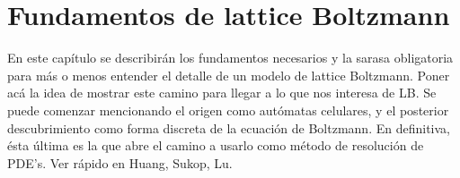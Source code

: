 \chapter{Fundamentos de lattice Boltzmann}
\label{chap:fundamentos}

En este cap\'itulo se describir\'an los fundamentos necesarios y la sarasa obligatoria para m\'as o menos entender el detalle de un modelo de lattice Boltzmann.
Poner ac\'a la idea de mostrar este camino para llegar a lo que nos interesa de LB. Se puede comenzar mencionando el origen como aut\'omatas celulares, y el posterior descubrimiento como forma discreta de la ecuaci\'on de Boltzmann. En definitiva, \'esta \'ultima es la que abre el camino a usarlo como m\'etodo de resoluci\'on de PDE's. Ver r\'apido en Huang, Sukop, Lu.


